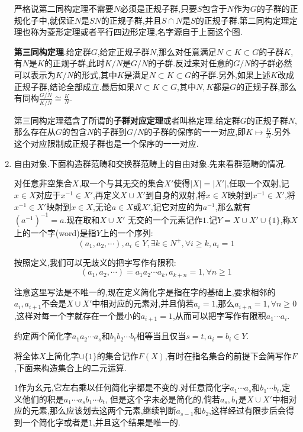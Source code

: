 \begin{enumerate}
	严格说第二同构定理不需要$N$必须是正规子群,只要$S$包含于$N$作为$G$的子群的正规化子中,就保证$N$是$SN$的正规子群,并且$S\cap N$是$S$的正规子群.第二同构定理定理也称为菱形定理或者平行四边形定理,名字源自于上面这个图.
	
	\textbf{第三同构定理}.给定群$G$,给定正规子群$N$,那么对任意满足$N\subset K\subset G$的子群$K$,有$N$是$K$的正规子群,此时$K/N$是$G/N$的子群.反过来对任意的$G/N$的子群必然可以表示为$K/N$的形式,其中$K$是满足$N\subset K\subset G$的子群.另外,如果上述$K$改成正规子群,结论全部成立.最后如果$N\subset K\subset G$,其中$N,K$都是$G$的正规子群,那么有同构$\frac{G/N}{K/N}\cong\frac{K}{N}$.
	
	第三同构定理蕴含了所谓的\textbf{子群对应定理}或者叫格定理.给定群$G$的正规子群$N$,那么存在从$G$的包含$N$的子群到$G/N$的子群的保序的一一对应,即$K\mapsto\frac{K}{N}$.另外这个对应限制成正规子群也是一个保序的一一对应.
	
	\item 自由对象.下面构造群范畴和交换群范畴上的自由对象.先来看群范畴的情况.
	
	对任意非空集合$X$,取一个与其无交的集合$X'$使得$|X|=|X'|$,任取一个双射,记$x\in X$对应于$x^{-1}\in X'$,再定义$X\cup X'$到自身的双射,将$x\in X$映射到$x^{-1}\in X'$,将$x^{-1}\in X'$映射到$x\in X$,无论$a\in X$或$X'$,记它对应的为$a^{-1}$,那么就有$(a^{-1})^{-1}=a$.现在取和$X\cup X'$ 无交的一个元素记作$1$.记$Y=X\cup X'\cup \{1\}$,称$X$上的一个字(word)是指$Y$上的一个序列:
	$$\left(a_1,a_2,\cdots\right),a_i\in Y,\exists k\in N^+,\forall i\ge k,a_i=1$$
	
	按照定义,我们可以无歧义的把字写作有限积:
	$$\left(a_1,a_2,\cdots\right)=a_1a_2\cdots a_k,a_{k+n}=1,\forall n\ge1$$
	
	注意这里写法是不唯一的,现在定义简化字是指在字的基础上,要求相邻的$a_i,a_ {i+1}$不会是$X\cup X'$中相对应的元素对,并且倘若$a_i=1$,那么$a_ {i+n}=1,\forall n\ge0$,这样对每一个字就存在一个最小的$a_{i+1}=1$,从而可以把字写作有限积$a_1\cdots a_i$.
	
	约定两个简化字$a_1a_2\cdots a_s$和$b_1b_2\cdots b_t$相等当且仅当$s=t,a_i=b_i\in Y$.
	
	将全体$X$上简化字$\cup \{1\}$的集合记作$F(X)$,有时在指名集合的前提下会简写作$F$,下面来构造集合上的二元运算.
	
	$1$作为幺元,它左右乘以任何简化字都是不变的.对任意简化字$a_1\cdots a_s$和$b_1\cdots b_t$,定义他们的积是$a_1\cdots a_sb_1\cdots b_t$, 但是这个字未必是简化的,倘若$a_s,b_1$是$X\cup X'$中相对应的元素,那么应该划去这两个元素,继续判断$a_{s-1}$和$b_2$,这样经过有限步后会得到一个简化字或者是$1$,并且这个结果是唯一的.
	

\end{enumerate}

